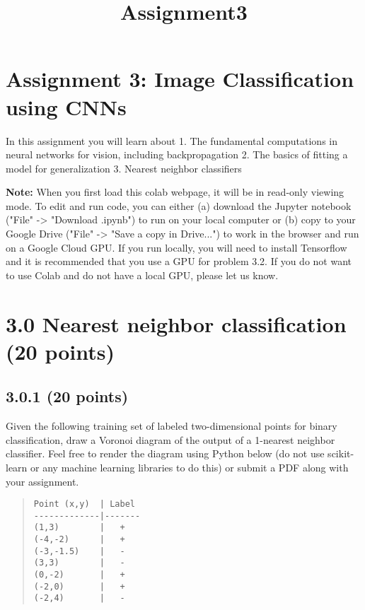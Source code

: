 \documentclass[11pt]{article}
\title{Assignment3}
\begin{document}
    
    
    \maketitle
    
    

    
    \section{Assignment 3: Image Classification using
CNNs}\label{assignment-3-image-classification-using-cnns}

    In this assignment you will learn about 1. The fundamental computations
in neural networks for vision, including backpropagation 2. The basics
of fitting a model for generalization 3. Nearest neighbor classifiers

\textbf{Note:} When you first load this colab webpage, it will be in
read-only viewing mode. To edit and run code, you can either (a)
download the Jupyter notebook ("File" -\textgreater{} "Download .ipynb")
to run on your local computer or (b) copy to your Google Drive ("File"
-\textgreater{} "Save a copy in Drive...") to work in the browser and
run on a Google Cloud GPU. If you run locally, you will need to install
Tensorflow and it is recommended that you use a GPU for problem 3.2. If
you do not want to use Colab and do not have a local GPU, please let us
know.

    \section{3.0 Nearest neighbor classification (20
points)}\label{nearest-neighbor-classification-20-points}

\subsection{3.0.1 (20 points)}\label{points}

Given the following training set of labeled two-dimensional points for
binary classification, draw a Voronoi diagram of the output of a
1-nearest neighbor classifier. Feel free to render the diagram using
Python below (do not use scikit-learn or any machine learning libraries
to do this) or submit a PDF along with your assignment.

\begin{quote}
\begin{verbatim}
Point (x,y)  | Label
-------------|-------
(1,3)        |   +
(-4,-2)      |   +
(-3,-1.5)    |   -
(3,3)        |   -
(0,-2)       |   +
(-2,0)       |   +
(-2,4)       |   -
\end{verbatim}
\end{quote}
\end{document}
